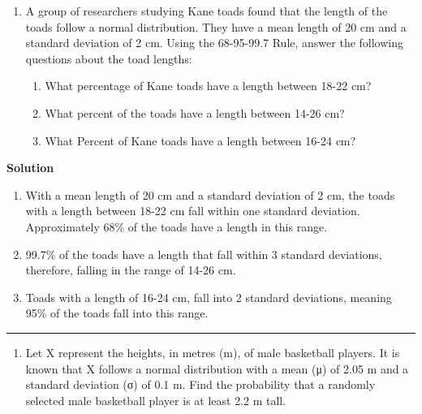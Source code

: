 \documentclass[
  letterpaper,
  DIV=11,
  numbers=noendperiod,
  oneside]{scrreprt}
\providecommand{\tightlist}{%
  \setlength{\itemsep}{0pt}\setlength{\parskip}{0pt}}\usepackage{longtable,booktabs,array}
\begin{document}
\begin{enumerate}
\def\labelenumi{\arabic{enumi}.}
\tightlist
\item
  A group of researchers studying Kane toads found that the length of
  the toads follow a normal distribution. They have a mean length of 20
  cm and a standard deviation of 2 cm. Using the 68-95-99.7 Rule, answer
  the following questions about the toad lengths:

  \begin{enumerate}
  \def\labelenumii{\alph{enumii}.}
  \tightlist
  \item
    What percentage of Kane toads have a length between 18-22 cm?
  \item
    What percent of the toads have a length between 14-26 cm?
  \item
    What Percent of Kane toads have a length between 16-24 cm?
  \end{enumerate}
\end{enumerate}

\textbf{Solution}

\begin{enumerate}
\def\labelenumi{\alph{enumi}.}
\tightlist
\item
  With a mean length of 20 cm and a standard deviation of 2 cm, the
  toads with a length between 18-22 cm fall within one standard
  deviation. Approximately 68\% of the toads have a length in this
  range.
\item
  99.7\% of the toads have a length that fall within 3 standard
  deviations, therefore, falling in the range of 14-26 cm.
\item
  Toads with a length of 16-24 cm, fall into 2 standard deviations,
  meaning 95\% of the toads fall into this range.
\end{enumerate}

\begin{center}\rule{0.5\linewidth}{0.5pt}\end{center}

\begin{enumerate}
\def\labelenumi{\arabic{enumi}.}
\setcounter{enumi}{1}
\tightlist
\item
  Let X represent the heights, in metres (m), of male basketball
  players. It is known that X follows a normal distribution with a mean
  (μ) of 2.05 m and a standard deviation (σ) of 0.1 m. Find the
  probability that a randomly selected male basketball player is at
  least 2.2 m tall.
\end{enumerate}
\end{document}
